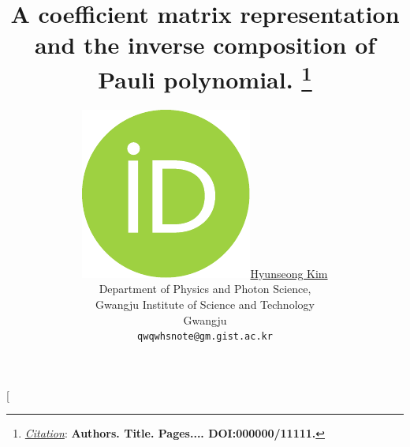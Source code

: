 \documentclass[twocolumn]{article}
\title{A coefficient matrix representation and the inverse composition of Pauli polynomial.
\thanks{\textit{\underline{Citation}}: 
\textbf{Authors. Title. Pages.... DOI:000000/11111.}} 
}
\author{
    \href{https://orcid.org/0000-0002-4876-7820}{
        \includegraphics[scale=0.06]{orcid.pdf}\hspace{1mm}Hyunseong Kim}\\
  Department of Physics and Photon Science,  \\
  Gwangju Institute of Science and Technology\\
  Gwangju\\
  \texttt{qwqwhsnote@gm.gist.ac.kr} \\
}
\begin{document}
\twocolumn[ 
\begin{@twocolumnfalse}
    \begin{center}

    \maketitle

\begin{abstract}




\end{abstract}
\end{center}
\end{@twocolumnfalse}
\end{document}
